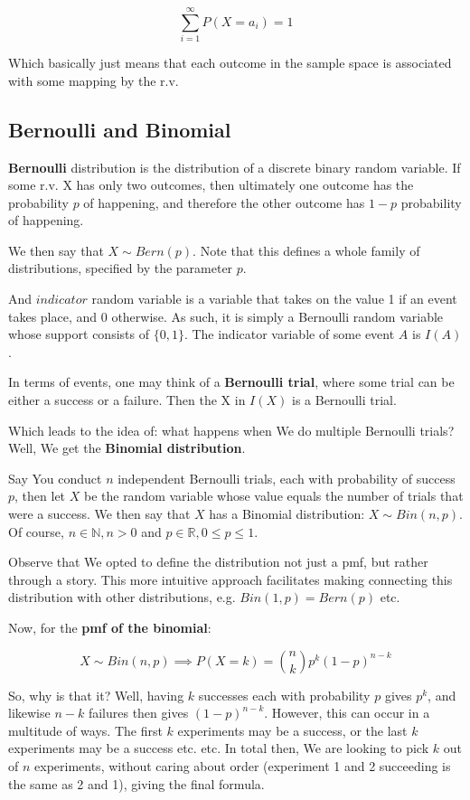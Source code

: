 \documentclass{article}
\begin{document}
			$$\sum^\infty_{i=1} P(X = a_i) = 1$$	
			
			Which basically just means that each outcome in the sample space is associated with some mapping by the r.v.
	
	\subsection{Bernoulli and Binomial}
	
		\textbf{Bernoulli} distribution is the distribution of a discrete binary random variable. If some r.v. X has only two outcomes, then ultimately one outcome has the probability $p$ of happening, and therefore the other outcome has $1-p$ probability of happening. 
		
		We then say that $X\sim Bern(p)$. Note that this defines a whole family of distributions, specified by the parameter $p$.
		
		And $indicator$ random variable is a variable that takes on the value 1 if an event takes place, and 0 otherwise. As such, it is simply a Bernoulli random variable whose support consists of $\{0, 1\}$. The indicator variable of some event $A$ is $I(A)$.
		
		In terms of events, one may think of a \textbf{Bernoulli trial}, where some trial can be either a success or a failure. Then the X in $I(X)$ is a Bernoulli trial.
		
		Which leads to the idea of: what happens when We do multiple Bernoulli trials? Well, We get the \textbf{Binomial distribution}.
		
		Say You conduct $n$ independent Bernoulli trials, each with probability of success $p$, then let $X$ be the random variable whose value equals the number of trials that were a success. We then say that $X$ has a Binomial distribution: $X \sim Bin(n, p)$. Of course, $n \in \mathbb{N}, n > 0$ and $p \in \mathbb{R}, 0 \le p \le 1$.
		
		Observe that We opted to define the distribution not just a pmf, but rather through a story. This more intuitive approach facilitates making connecting this distribution with other distributions, e.g. $Bin(1, p) = Bern(p)$ etc.
		
		Now, for the \textbf{pmf of the binomial}:
		
		$$ X \sim Bin(n, p) \implies P(X = k) = {n \choose k}p^k(1-p)^{n-k} $$
		
		So, why is that it? Well, having $k$ successes each with probability $p$ gives $p^k$, and likewise $n-k$ failures then gives $(1-p)^{n-k}$. However, this can occur in a multitude of ways. The first $k$ experiments may be a success, or the last $k$ experiments may be a success etc. etc. In total then, We are looking to pick $k$ out of $n$ experiments, without caring about order (experiment 1 and 2 succeeding is the same as 2 and 1), giving the final formula.
		
\end{document}
